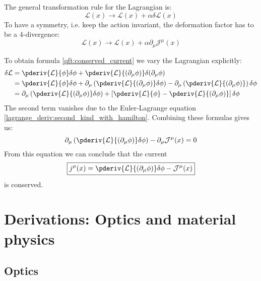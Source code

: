 	The general transformation rule for the Lagrangian is:
	\begin{equation}
		\label{noether_deriv:1}
		\mathcal{L}(x)\rightarrow\mathcal{L}(x) + \alpha\delta\mathcal{L}(x)
	\end{equation}
	To have a symmetry, i.e. keep the action invariant, the deformation factor has to be a 4-divergence:
	\begin{equation}
		\label{noether_deriv:2}
		\mathcal{L}(x)\rightarrow\mathcal{L}(x) + \alpha\partial_\mu\mathcal{J}^\mu(x)
	\end{equation}

	To obtain formula \ref{qft:conserved_current} we vary the Lagrangian explicitly:
	\begin{align*}
		\delta\mathcal{L} &= \pderiv{\mathcal{L}}{\phi}\delta\phi + \pderiv{\mathcal{L}}{(\partial_\mu\phi)}\delta(\partial_\mu\phi)\\
		&= \pderiv{\mathcal{L}}{\phi}\delta\phi + \partial_\mu\left(\pderiv{\mathcal{L}}{(\partial_\mu\phi)}\delta\phi\right) - \partial_\mu\left(\pderiv{\mathcal{L}}{(\partial_\mu\phi)}\right)\delta\phi\\
		&= \partial_\mu\left(\pderiv{\mathcal{L}}{(\partial_\mu\phi)}\delta\phi\right) + \left[\pderiv{\mathcal{L}}{\phi} - \pderiv{\mathcal{L}}{(\partial_\mu\phi)}\right]\delta\phi
	\end{align*}
	The second term vanishes due to the Euler-Lagrange equation \ref{lagrange_deriv:second_kind_with_hamilton}. Combining these formulas gives us:
	\begin{equation}
		\partial_\mu\left(\pderiv{\mathcal{L}}{(\partial_\mu\phi)}\delta\phi\right) - \partial_\mu\mathcal{J}^\mu(x) = 0
	\end{equation}
	From this equation we can conclude that the current
	\begin{equation}
		\boxed{j^\mu(x) = \pderiv{\mathcal{L}}{(\partial_\mu\phi)}\delta\phi - \mathcal{J}^\mu(x)}
	\end{equation}
	is conserved.


\chapter{Derivations: Optics and material physics}
\section{Optics}
